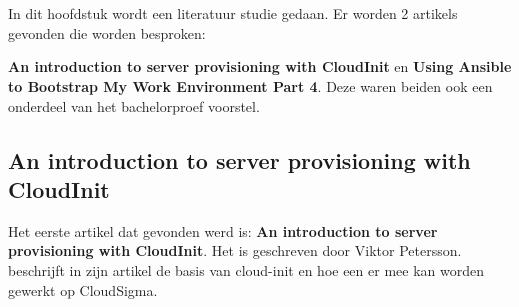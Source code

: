 \chapter{}
\label{ch:stand-van-zaken}







In dit hoofdstuk wordt een literatuur studie gedaan. Er worden 2 artikels gevonden die worden besproken: 

\textbf{An introduction to server provisioning with CloudInit} en \textbf{Using Ansible to Bootstrap My Work Environment Part 4}. Deze waren beiden ook een onderdeel van het bachelorproef voorstel.

\section{An introduction to server provisioning with CloudInit}
Het eerste artikel dat gevonden werd is: \textbf{An introduction to server provisioning with CloudInit}. Het is geschreven door Viktor Petersson. \autocite{viktorpet} beschrijft in zijn artikel de basis van cloud-init en hoe een er mee kan worden gewerkt op CloudSigma. 

